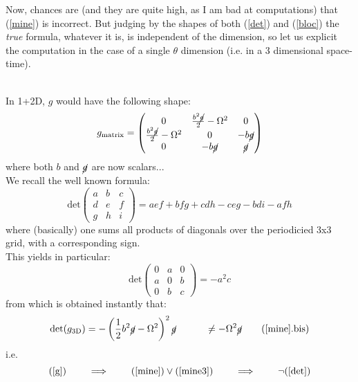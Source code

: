 \documentclass[a4paper,11pt]{article}
\begin{document}
Now, chances are (and they are quite high, as I am bad at computations) that (\ref{mine}) is incorrect. But judging by the shapes of both (\ref{det}) and (\ref{bloc}) the \emph{true} formula, whatever it is, is independent of the dimension, so let us explicit the computation in the case of a single $\theta$ dimension (i.e. in a 3 dimensional space-time).


\noindent \\ In 1+2D, $g$ would have the following shape:
\begin{equation}
    g_\mathrm{matrix}=\left(\begin{matrix}
        0 & \frac{b^2\cancel{g}}{2}-\Omega^2 & 0\\
        \frac{b^2\cancel{g}}{2}-\Omega^2& 0 & -b\cancel{g}\\
        0 & -b\cancel{g} & \cancel{g}
    \end{matrix}\right)
\end{equation}
where both $b$ and $\cancel{g}$ are now scalars...\\
We recall the well known formula:
\begin{equation}
    \mathrm{det}\left(\begin{matrix}
        a & b & c\\
        d & e & f\\
        g & h & i
    \end{matrix}\right)=aef +bfg+cdh - ceg - bdi - afh
\end{equation}
where (basically) one sums all products of diagonals over the periodicied 3x3 grid, with a corresponding sign.\\
This yields in particular:
\begin{equation*}
    \mathrm{det}\left(\begin{matrix}
        0 & a & 0\\
        a & 0 & b\\
        0 & b & c
    \end{matrix}\right)=-a^2c
\end{equation*}
from which is obtained instantly that:
\begin{equation} \label{mine3}
    \mathrm{det}(g_{3\mathrm{D}})=-\left(\frac{1}{2}b^2\cancel{g}-\Omega^2\right)^2\cancel{g} \quad\quad\quad\ne -\Omega^2\cancel{g} \tag{\ref{mine}.bis}
\end{equation}
i.e.
$$(\ref{g})\quad\quad\implies\quad\quad (\ref{mine}) \vee (\ref{mine3}) \quad\quad\implies\quad\quad \neg(\ref{det})$$
\\
\end{document}
